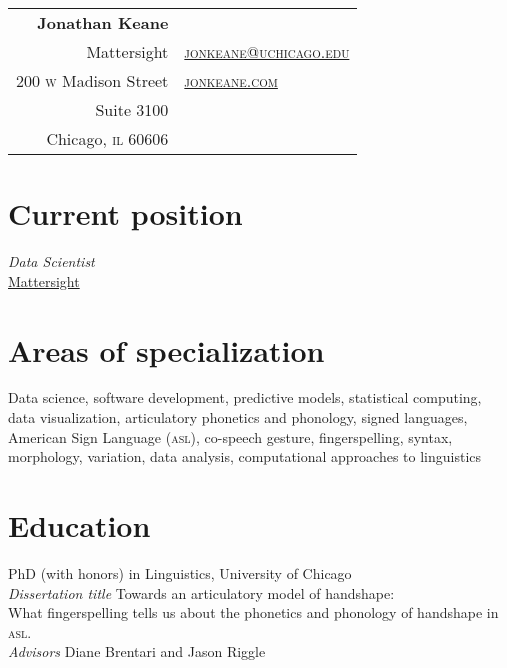 \documentclass[10pt, letterpaper]{article}
\newcommand{\years}[1]{\marginpar{\scriptsize #1}}
\begin{document}
\thispagestyle{empty} %
\reversemarginpar
\raggedright

\begin{table}[!t]
  \begin{tabular*}{6.5in}{r|l}
    \hspace{3in}\textbf{\LARGE\sffamily Jonathan Keane}  &\\
Mattersight & \href{mailto:jonkeane@uchicago.edu}{\textsc{jonkeane@uchicago.edu}}\\
  200 \textsc{w} Madison Street
 & \href{http://jonkeane.com}{\textsc{jonkeane.com}}\\
 Suite 3100 & \\
Chicago, \textsc{il} 60606 & \\
  \end{tabular*}
\end{table}
\setlength\parindent{0in}
\setlength\parskip{0ex}
\section*{Current position}
\emph{Data Scientist}\\ \href{http://www.mattersight.com}{Mattersight}

\section*{Areas of specialization}
Data science, software development, predictive models, statistical computing, data visualization, articulatory phonetics and phonology, signed languages, American Sign Language \textsc{(asl)}, co-speech gesture, fingerspelling, syntax, morphology, variation, data analysis, computational approaches to linguistics


\section*{Education}
\-\years{2014}PhD (with honors) in Linguistics, University of Chicago \\
\hspace{2em} \textit{Dissertation title} Towards an articulatory model of handshape:\\
\hspace{4em}What fingerspelling tells us about the phonetics and phonology of handshape in \textsc{asl}.\\
\hspace{2em} \textit{Advisors} Diane Brentari and Jason Riggle
\end{document}
